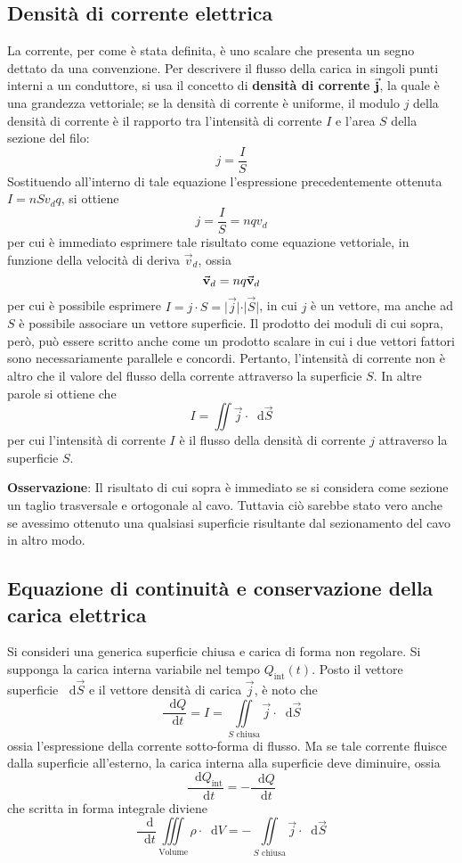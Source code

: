 \documentclass[a4paper]{extarticle}
\newcommand\dif{\mathop{}\!\mathrm{d}}
\begin{document}
\subsection{Densità di corrente elettrica}
La corrente, per come è stata definita, è uno scalare che presenta un segno dettato da una convenzione. Per descrivere il flusso della carica in singoli punti interni a un conduttore, si usa il concetto di \textbf{densità di corrente} $\va{j}$, la quale è una grandezza vettoriale; se la densità di corrente è uniforme, il modulo $j$ della densità di corrente è il rapporto tra l'intensità di corrente $I$ e l'area $S$ della sezione del filo:
\[\boxed{j = \dfrac{I}{S}}\]
Sostituendo all'interno di tale equazione l'espressione precedentemente ottenuta $I=n S v_d q$, si ottiene
\[j = \dfrac{I}{S} = n q v_d\]
per cui è immediato esprimere tale risultato come equazione vettoriale, in funzione della velocità di deriva $\vec{v}_d$, ossia
\[\va{v}_d = n q \va{v}_d\]
per cui è possibile esprimere $I=j \cdot S = \vert \vec j \vert \cdot \vert \vec S \vert$, in cui $j$ è un vettore, ma anche ad $S$ è possibile associare un vettore superficie. Il prodotto dei moduli di cui sopra, però, può essere scritto anche come un prodotto scalare in cui i due vettori fattori sono necessariamente parallele e concordi. Pertanto, l'intensità di corrente non è altro che il valore del flusso della corrente attraverso la superficie $S$. In altre parole si ottiene che
\[\boxed{I=\iint \vec j \cdot \dif \vec S}\]
per cui l'intensità di corrente $I$ è il flusso della densità di corrente $j$ attraverso la superficie $S$.

\vspace{1em}
\noindent
\textbf{Osservazione}: Il risultato di cui sopra è immediato se si considera come sezione un taglio trasversale e ortogonale al cavo. Tuttavia ciò sarebbe stato vero anche se avessimo ottenuto una qualsiasi superficie risultante dal sezionamento del cavo in altro modo.

\vspace{1em}
\noindent
\subsection{Equazione di continuità e conservazione della carica elettrica}
Si consideri una generica superficie chiusa e carica di forma non regolare. Si supponga la carica interna variabile nel tempo $Q_\text{int}(t)$. Posto il vettore superficie $\dif \vec S$ e il vettore densità di carica $\vec j$, è noto che
\[\dfrac{\dif Q}{\dif t} = I = \underset{S \text{ chiusa}}{\iint} \vec j \cdot \dif \vec S\]
ossia l'espressione della corrente sotto-forma di flusso. Ma se tale corrente fluisce dalla superficie all'esterno, la carica interna alla superficie deve diminuire, ossia
\[\dfrac{\dif Q_\text{int}}{\dif t} = - \dfrac{\dif Q}{\dif t}\]
che scritta in forma integrale diviene
\[\dfrac{\dif }{\dif t} \underset{\text{Volume}}{\iiint} \rho \cdot \dif V = - \underset{S \text{ chiusa}}{\iint} \vec j \cdot \dif \vec S\]
\end{document}
